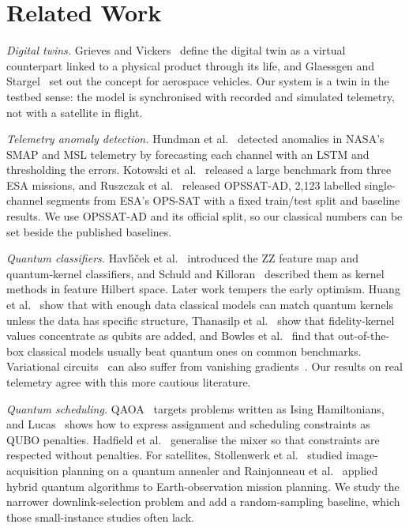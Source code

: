 \documentclass[conference]{IEEEtran}
\begin{document}
\section{Related Work}
\textit{Digital twins.} Grieves and Vickers~\cite{grieves2017} define the digital twin as a
virtual counterpart linked to a physical product through its life, and Glaessgen and
Stargel~\cite{glaessgen2012} set out the concept for aerospace vehicles. Our system is a twin
in the testbed sense: the model is synchronised with recorded and simulated telemetry, not
with a satellite in flight.

\textit{Telemetry anomaly detection.} Hundman et al.~\cite{hundman2018} detected anomalies in
NASA's SMAP and MSL telemetry by forecasting each channel with an LSTM and thresholding the
errors. Kotowski et al.~\cite{kotowski2024} released a large benchmark from three ESA
missions, and Ruszczak et al.~\cite{ruszczak2025} released OPSSAT-AD, 2,123 labelled
single-channel segments from ESA's OPS-SAT with a fixed train/test split and baseline results.
We use OPSSAT-AD and its official split, so our classical numbers can be set beside the
published baselines.

\textit{Quantum classifiers.} Havl\'{\i}\v{c}ek et al.~\cite{havlicek2019} introduced the ZZ
feature map and quantum-kernel classifiers, and Schuld and Killoran~\cite{schuld2019}
described them as kernel methods in feature Hilbert space. Later work tempers the early
optimism. Huang et al.~\cite{huang2021} show that with enough data classical models can match
quantum kernels unless the data has specific structure, Thanasilp et
al.~\cite{thanasilp2024} show that fidelity-kernel values concentrate as qubits are added,
and Bowles et al.~\cite{bowles2024} find that out-of-the-box classical models usually beat
quantum ones on common benchmarks. Variational circuits~\cite{cerezo2021} can also suffer
from vanishing gradients~\cite{mcclean2018}. Our results on real telemetry agree with this
more cautious literature.

\textit{Quantum scheduling.} QAOA~\cite{farhi2014} targets problems written as Ising
Hamiltonians, and Lucas~\cite{lucas2014} shows how to express assignment and scheduling
constraints as QUBO penalties. Hadfield et al.~\cite{hadfield2019} generalise the mixer so
that constraints are respected without penalties. For satellites, Stollenwerk et
al.~\cite{stollenwerk2020} studied image-acquisition planning on a quantum annealer and
Rainjonneau et al.~\cite{rainjonneau2023} applied hybrid quantum algorithms to Earth-observation
mission planning. We study the narrower downlink-selection problem and add a random-sampling
baseline, which those small-instance studies often lack.
\end{document}
